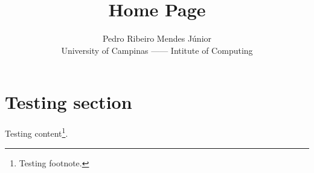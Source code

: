 \documentclass{article}
\title{Home Page}
\author{Pedro Ribeiro Mendes J\'{u}nior\\
  University of Campinas ------ Intitute of Computing}
\begin{document}
\maketitle

\section{Testing section}

Testing content\footnote{Testing footnote.}.
\end{document}
